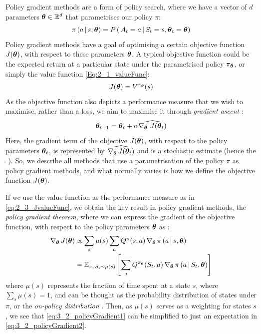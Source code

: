 Policy gradient methods are a form of policy search, where we have a vector of $d$ parameters $\boldsymbol{\theta} \in \mathbb{R}^d$ that parametrises our policy $\pi$:
\begin{equation}
    \pi \, (a \, | \, s, \boldsymbol{\theta}) = P \, ( \, A_t = a \, | \, S_t = s, \boldsymbol{\theta}_t = \boldsymbol{\theta})
\end{equation}
Policy gradient methods have a goal of optimising a certain objective function $J(\boldsymbol{\theta})$, with respect to these parameters $\boldsymbol{\theta}$. A typical objective function could be the expected return at a particular state under the parametrised policy $\pi_{\boldsymbol{\theta}}$, or simply the value function \eqref{Eq:2_1_valueFunc}:
\begin{equation}
    J(\boldsymbol{\theta}) = V^{\pi_{\boldsymbol{\theta}}}(s) \label{eq:2_3_JvalueFunc}
\end{equation}
As the objective function also depicts a performance measure that we wish to maximise, rather than a loss, we aim to maximise it through \textit{gradient ascent} \cite{suttonAndBartoBook}:
\begin{equation}
    \boldsymbol{\theta}_{t+1} = \boldsymbol{\theta}_t + \alpha \widehat{\nabla_{\boldsymbol{\theta}} \, \, J(\boldsymbol{\theta}_t)} \label{eq:3_2_gradientasc}
\end{equation}
Here, the gradient term of the objective $J(\boldsymbol{\theta})$, with respect to the policy parameters $\boldsymbol{\theta}_t$, is represented by $\widehat{\nabla_{\boldsymbol{\theta}} \, J(\boldsymbol{\theta}_t)}$ and is a stochastic estimate (hence the $\hat{\:}\,$). So, we describe all methods that use a parametrisation of the policy $\pi$ as policy gradient methods, and what normally varies is how we define the objective function $J(\boldsymbol{\theta})$.

If we use the value function as the performance measure as in \eqref{eq:2_3_JvalueFunc}, we obtain the key result in policy gradient methods, the \textit{policy gradient theorem}, where we can express the gradient of the objective function, with respect to the policy parameters $\boldsymbol{\theta}$ as \cite{suttonAndBartoBook}:
\begin{align}
    \nabla_{\boldsymbol{\theta}} \, J(\boldsymbol{\theta}) &\propto \sum_s \mu(s) \sum_a Q^{\pi} (s,a) \, \nabla_{\boldsymbol{\theta}} \, \pi \, (a \, | \, s, \boldsymbol{\theta}) \label{eq:3_2_policyGradient1} \\
    &= \mathbb{E}_{\pi,\, S_t \sim \mu(s)} \left[\sum_a Q^{\pi_{\boldsymbol{\theta}}} (S_t,a) \, \nabla_{\boldsymbol{\theta}} \, \pi \, (a \, | \, S_t, \boldsymbol{\theta}) \right] \label{eq:3_2_policyGradient2}
\end{align}
where $\mu(s)$ represents the fraction of time spent at a state $s$, where $\sum_s \mu(s) =1$, and can be thought as the probability distribution of states under $\pi$, or the \textit{on-policy distribution} \cite{suttonAndBartoBook}. 
Then, as $\mu(s)$ serves as a weighting for states $s$, we see that \eqref{eq:3_2_policyGradient1} can be simplified to just an expectation in \eqref{eq:3_2_policyGradient2}.

